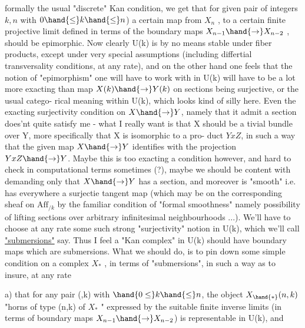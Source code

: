 
formally the usual "discrete" Kan condition, we get that \hand{(}for given pair
of integers $k,n$ with $0\hand{\leq}k\hand{\leq}n$) a certain map from $X_n$ , to a certain
 finite projective limit defined in terms of the boundary
maps $X_{n-1}\hand{\to}X_{n-2}$ , should be  epimorphic. Now clearly U(k)
is by no means stable under fiber products, except under very special
assumptions (including differtial transversality conditions, at any
rate), and on the other hand one feels that the notion of "epimorphism"
one will have to work with in U(k) will have to be a lot more exacting
than  map $X(k)\hand{\to}Y(k)$ on sections being surjective, or the usual catego-%
rical meaning within U(k), which looks kind of silly here. Even the 
exacting surjectivity condition on $X\hand{\to}Y$, namely that it admit a section\hand{\unsure{,}}
does'nt quite satisfy me - what I really want is that X should be a
tivial bundle over Y, more specifically that X is isomorphic to a pro-%
duct $YxZ$, in such a way that the given map $X\hand{\to}Y$ identifies with the
projection $YxZ\hand{\to}Y$. Maybe this is too exacting a condition however, and
hard to check in computational terms sometimes (?), maybe we should be
content with demanding only that $X\hand{\to}Y$ has a section, and moreover is
"smooth" i.e. has everywhere a surjectie tangent map (which may be
  on the corresponding sheaf on $\mathrm{Aff}_{/k}$ by the familiar condition
of "formal smoothness" namely possibility of lifting sections over
arbitrary infinitesimal neighbourhoods ...). We'll have to choose at any
rate some such  strong "surjectivity" notion in U(k), which we'll
call \uline{"submersions"} say. Thus I feel a "Kan complex" in U(k) should have
boundary maps which are submersions. What we should do, is to pin down
some simple  condition on a complex $X_*$ , in terms of "submersions",
in such a way as to insure, at any rate

a) that for any pair (,k) with $\hand{0\leq}k\hand{\leq}n$, the object $X_{\hand{*}}(n,k)$
"horns of type (n,k) of $X_*$ "\hand{,} expressed by the suitable finite inverse
limits (in terms of boundary maps $X_{n-1}\hand{\to}X_{n-2}$) is representable in U(k),
and

